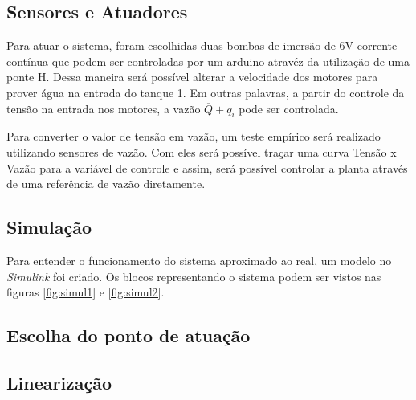 \documentclass[a4paper,11pt]{article}
\begin{document}
\subsection{Sensores e Atuadores}

Para atuar o sistema, foram escolhidas duas bombas de imersão de 6V corrente contínua que podem ser controladas por um arduino atravéz da utilização de uma ponte H. Dessa maneira será possível alterar a velocidade dos motores para prover água na entrada do tanque 1. Em outras palavras, a partir do controle da tensão na entrada nos motores, a vazão $\overline{Q} + q_i$ pode ser controlada.

Para converter o valor de tensão em vazão, um teste empírico será realizado utilizando sensores de vazão. Com eles será possível traçar uma curva Tensão x Vazão para a variável de controle e assim, será possível controlar a planta através de uma referência de vazão diretamente.





\subsection{Simulação}

Para entender o funcionamento do sistema aproximado ao real, um modelo no \textit{Simulink} foi criado. Os blocos representando o sistema podem ser vistos nas figuras \ref{fig:simul1} e \ref{fig:simul2}.



\subsection{Escolha do ponto de atuação}

\subsection{Linearização}











\end{document}
